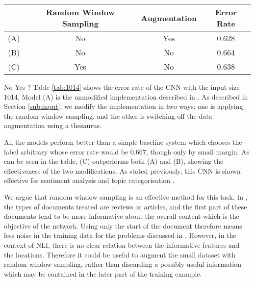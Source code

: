 
\begin{table*}[]
\centering
\caption{Error Rate of Models with Input Size 1014}
\label{tab:1014}
\begin{tabular}{cccc}
& Random Window Sampling & Augmentation  & Error Rate \\ \hline
(A)& No                     & Yes                & 0.628      \\
(B)& No                     & No                 & \color{red}0.664\color{black}      \\
(C)& Yes                    & No                 & \color{red}0.638\color{black}     
\end{tabular}
\end{table*}
\color{red}No Yes ?\color{black}
Table \ref{tab:1014} shows the error rate of the CNN with the input size 1014.
Model (A) is the unmodified implementation described in \citep{zhang2015character}.
As described in Section \ref{sub:input}, we modify the implementation in two ways; one is applying the random window sampling, and the other is switching off the data augmentation using a thesaurus.

All the models perform better than a simple baseline system which chooses the label arbitrary whose error rate would be $0.667$, though only by small margin.
As can be seen in the table, (C) outperforms both (A) and (B), showing the effectiveness of the two modifications.
As stated previously, this CNN is shown effective for sentiment analysis and topic categorisation \citep{zhang2015character}.

We argue that random window sampling is an effective method for this task.
In \citep{zhang2015character}, the types of documents treated are reviews or articles, and the first part of these documents tend to be more informative about the overall content which is the objective of the network.
Using only the start of the document therefore means less noise in the training data for the problems discussed in \citep{zhang2015character}.
However, in the context of NLI, there is no clear relation between the informative features and the locations.
Therefore it could be useful to augment the small dataset with random window sampling, rather than discarding a possibly useful information which may be contained in the later part of the training example.

